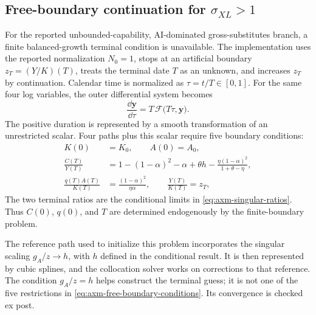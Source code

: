 \subsection{Free-boundary continuation for \texorpdfstring{\(\sigma_{XL}>1\)}{sigma XL > 1}}

For the reported unbounded-capability, AI-dominated gross-substitutes branch, a
finite balanced-growth terminal condition is unavailable. The implementation
uses the reported normalization \(N_0=1\), stops at an artificial boundary
\(z_T=(Y/K)(T)\), treats the terminal date \(T\) as an unknown, and increases
\(z_T\) by continuation. Calendar time is normalized as \(\tau=t/T\in[0,1]\).
For the same four log variables, the outer differential system becomes
\begin{equation}
 \frac{\dd\mathbf y}{\dd\tau}
 =T\,\mathcal F\bigl(T\tau,\mathbf y\bigr).
 \label{eq:axm-free-boundary-rhs}
\end{equation}
The positive duration is represented by a smooth transformation of an
unrestricted scalar. Four paths plus this scalar require five boundary
conditions:
\begin{equation}
 \begin{split}
 K(0)&=K_0,\qquad A(0)=A_0,\\
 \frac{C(T)}{Y(T)}
 &=1-(1-\alpha)^2-\alpha+\theta h
 -\frac{\eta(1-\alpha)^2}{1+\theta-\eta},\\
 \frac{q(T)A(T)}{K(T)}&=\frac{(1-\alpha)^2}{\eta\alpha},\qquad
 \frac{Y(T)}{K(T)}=z_T,
 \end{split}
 \label{eq:axm-free-boundary-conditions}
\end{equation}
The two terminal ratios are the conditional limits in
\eqref{eq:axm-singular-ratios}. Thus \(C(0)\), \(q(0)\), and \(T\) are
determined endogenously by the finite-boundary problem.

The reference path used to initialize this problem incorporates the singular
scaling \(g_A/z\to h\), with \(h\) defined in the conditional result. It is then
represented by cubic splines, and the collocation solver works on corrections to
that reference. The condition \(g_A/z=h\) helps construct the terminal guess; it
is not one of the five restrictions in
\eqref{eq:axm-free-boundary-conditions}. Its convergence is checked ex post.

